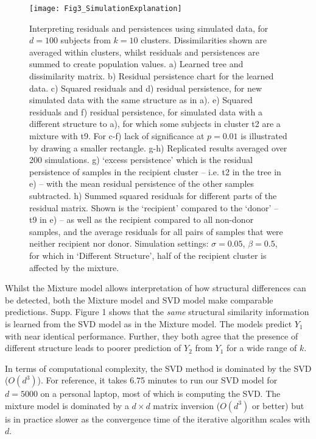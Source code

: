 \documentclass[a4]{article}
\newcommand{\+}[1]{\mathbf{#1}}
\begin{document}
\begin{figure}[!htbp]
\begin{center}
 \centerline{\texttt{[image: Fig3\_SimulationExplanation]}}
 \caption{Interpreting residuals and persistences using simulated data, for $d=100$ subjects from $k=10$ clusters. Dissimilarities shown are averaged within clusters, whilst residuals and persistences are summed to create population values. a) Learned tree and dissimilarity matrix. b) Residual persistence chart for the learned data. c) Squared residuals and d) residual persistence, for new simulated data with the same structure as in a). e) Squared residuals and f) residual persistence, for simulated data with a different structure to a), for which some subjects in cluster t2 are a mixture with t9. For c-f) lack of significance at $p=0.01$ is illustrated by drawing a smaller rectangle. %
g-h) Replicated results averaged over 200 simulations. g) `excess persistence' which is the residual persistence of samples in the recipient cluster -- i.e. t2 in the tree in e) -- with the mean residual persistence of the other samples subtracted. h) Summed squared residuals for different parts of the residual matrix. Shown is the `recipient' compared to the `donor' -- t9 in  e) -- as well as the recipient compared to all non-donor samples, and the average residuals for all pairs of samples that were neither recipient nor donor. Simulation settings: $\sigma=0.05$, $\beta=0.5$, for which in `Different Structure', half of the recipient cluster is affected by the mixture.}
\label{fig:simexplain}
\end{center}
\end{figure}


Whilst the Mixture model allows interpretation of how structural differences can be detected, both the Mixture model and SVD model make comparable predictions. Supp. Figure 1 shows that the \emph{same} structural similarity information is learned from the SVD model as in the Mixture model. The models predict $Y_1$ with near identical performance. Further, they both agree that the presence of different structure leads to poorer prediction of $Y_2$ from $Y_1$ for a wide range of $k$.

In terms of computational complexity, the SVD method is dominated by the SVD ($O(d^3)$). For reference, it takes 6.75 minutes to run our SVD model for $d=5000$ on a personal laptop, most of which is computing the SVD. The mixture model is dominated by a $d \times d$ matrix inversion ($O(d^3)$ or better) but is in practice slower as the convergence time of the iterative algorithm scales with $d$.
\end{document}
